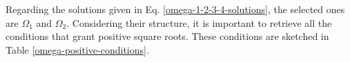 Regarding the solutions given in Eq. \ref{omega-1-2-3-4-solutions}, the selected ones are $\Omega_1$ and $\Omega_2$. Considering their structure, it is important to retrieve all the conditions that grant positive square roots. These conditions are sketched in Table \ref{omega-positive-conditions}.
\begin{table}
    \centering
    \caption{The conditions for which the square roots that appear in the two solutions $\Omega_{1,2}$ given in Eq. \ref{omega-1-2-3-4-solutions} are positive, such that real quantities can be obtained. The trivial solution $B=C=0$ has been dismissed.}
    \label{omega-positive-conditions}
\end{table}

